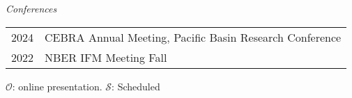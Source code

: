 \documentclass[10pt]{article}
\begin{document}
\noindent \emph{Conferences}\\[0.1in]
\begin{tabular}{@{}p{1.8cm}p{13cm}}
2024 & CEBRA Annual Meeting, Pacific Basin Research Conference\\
2022& NBER IFM Meeting Fall
\end{tabular}


{\footnotesize $\mathcal{O}$: online presentation. $\mathcal{S}$: Scheduled}









%
%
%

\end{document}

